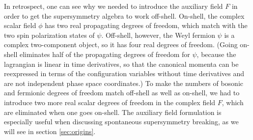 In retrospect, one can see why we needed to introduce the auxiliary
field $F$ in order to get the supersymmetry algebra to work off-shell.
On-shell, the complex scalar field $\phi$
has two real propagating degrees of freedom, which
match with the two spin polarization states of $\psi$.
Off-shell, however,
the Weyl fermion $\psi$ is a complex two-component object,
so it has four real degrees of freedom. (Going on-shell
eliminates half of the propagating degrees of freedom
for $\psi$, because the lagrangian is linear in
time derivatives, so that the canonical momenta can be reexpressed in
terms of 
the configuration variables without time derivatives and are not
independent phase space coordinates.)
To make the numbers of bosonic and fermionic degrees of freedom match
off-shell as well
as on-shell, we had to introduce two more real scalar degrees of
freedom in the complex field $F$, which are eliminated when one
goes on-shell. The auxiliary field formulation is especially useful
when discussing spontaneous supersymmetry breaking, as we will see
in section \ref{sec:origins}.

